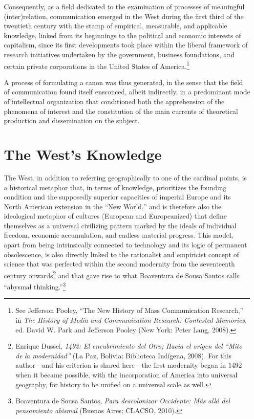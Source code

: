 \documentclass{tufte-handout}
\begin{document}
Consequently, as a field dedicated to the examination of processes of
meaningful (inter)relation, communication emerged in the West during the
first third of the twentieth century with the stamp of empirical,
measurable, and applicable knowledge, linked from its beginnings to the
political and economic interests of capitalism, since its first
developments took place within the liberal framework of research
initiatives undertaken by the government, business foundations, and
certain private corporations in the United States of America.\footnote{See
  Jefferson Pooley, ``The New History of Mass Communication Research,''
  in \emph{The History of Media and Communication Research: Contested
  Memories}, ed. David W. Park and Jefferson Pooley (New York: Peter
  Lang, 2008).}

A process of formulating a canon was thus generated, in the sense that
the field of communication found itself ensconced, albeit indirectly, in
a predominant mode of intellectual organization that conditioned both
the apprehension of the phenomena of interest and the constitution of
the main currents of theoretical production and dissemination on the
subject.

\hypertarget{the-wests-knowledge}{%
\section{The West's Knowledge}\label{the-wests-knowledge}}

The West, in addition to referring geographically to one of the cardinal
points, is a historical metaphor that, in terms of knowledge,
prioritizes the founding condition and the supposedly superior
capacities of imperial Europe and its North American extension in the
``New World,'' and is therefore also the ideological metaphor of
cultures (European and Europeanized) that define themselves as a
universal civilizing pattern marked by the ideals of individual freedom,
economic accumulation, and endless material progress. This model, apart
from being intrinsically connected to technology and its logic of
permanent obsolescence, is also directly linked to the rationalist and
empiricist concept of science that was perfected within the second
modernity from the seventeenth century onwards\footnote{Enrique Dussel,
  \emph{1492: El encubrimiento del Otro; Hacia el origen del ``Mito de
  la modernidad''} (La Paz, Bolivia: Biblioteca Indígena, 2008). For
  this author---and his criterion is shared here---the first modernity
  began in 1492 when it became possible, with the incorporation of
  America into universal geography, for history to be unified on a
  universal scale as well.} and that gave rise to what Boaventura de
Sousa Santos calls ``abysmal thinking.''\footnote{Boaventura de Sousa
  Santos, \emph{Para descolonizar Occidente: Más allá del pensamiento
  abismal} (Buenos Aires: CLACSO, 2010).}
\end{document}
